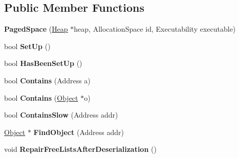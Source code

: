 \subsection*{Public Member Functions}
\begin{DoxyCompactItemize}
\item 
{\bfseries Paged\+Space} (\hyperlink{classv8_1_1internal_1_1_heap}{Heap} $\ast$heap, Allocation\+Space id, Executability executable)\hypertarget{classv8_1_1internal_1_1_paged_space_a6440528a56d355adf4767b78ea110d09}{}\label{classv8_1_1internal_1_1_paged_space_a6440528a56d355adf4767b78ea110d09}

\item 
bool {\bfseries Set\+Up} ()\hypertarget{classv8_1_1internal_1_1_paged_space_af8ba36c892e14fc7888d6d8945382e2a}{}\label{classv8_1_1internal_1_1_paged_space_af8ba36c892e14fc7888d6d8945382e2a}

\item 
bool {\bfseries Has\+Been\+Set\+Up} ()\hypertarget{classv8_1_1internal_1_1_paged_space_a92d5ccd0071a8d300f87347775bffe7b}{}\label{classv8_1_1internal_1_1_paged_space_a92d5ccd0071a8d300f87347775bffe7b}

\item 
bool {\bfseries Contains} (Address a)\hypertarget{classv8_1_1internal_1_1_paged_space_a036e435d35992934e04555cafc9862f3}{}\label{classv8_1_1internal_1_1_paged_space_a036e435d35992934e04555cafc9862f3}

\item 
bool {\bfseries Contains} (\hyperlink{classv8_1_1internal_1_1_object}{Object} $\ast$o)\hypertarget{classv8_1_1internal_1_1_paged_space_a44185c0be4d9a8399df8f4fa93567e45}{}\label{classv8_1_1internal_1_1_paged_space_a44185c0be4d9a8399df8f4fa93567e45}

\item 
bool {\bfseries Contains\+Slow} (Address addr)\hypertarget{classv8_1_1internal_1_1_paged_space_a794549ba01a528900a103d7edc5a3abe}{}\label{classv8_1_1internal_1_1_paged_space_a794549ba01a528900a103d7edc5a3abe}

\item 
\hyperlink{classv8_1_1internal_1_1_object}{Object} $\ast$ {\bfseries Find\+Object} (Address addr)\hypertarget{classv8_1_1internal_1_1_paged_space_ac0e988057d41f0c54dafbf5a1df66965}{}\label{classv8_1_1internal_1_1_paged_space_ac0e988057d41f0c54dafbf5a1df66965}

\item 
void {\bfseries Repair\+Free\+Lists\+After\+Deserialization} ()\hypertarget{classv8_1_1internal_1_1_paged_space_a5dc469ed3e2bc01b2d6072ec2ef42193}{}\label{classv8_1_1internal_1_1_paged_space_a5dc469ed3e2bc01b2d6072ec2ef42193}


\end{DoxyCompactItemize}
